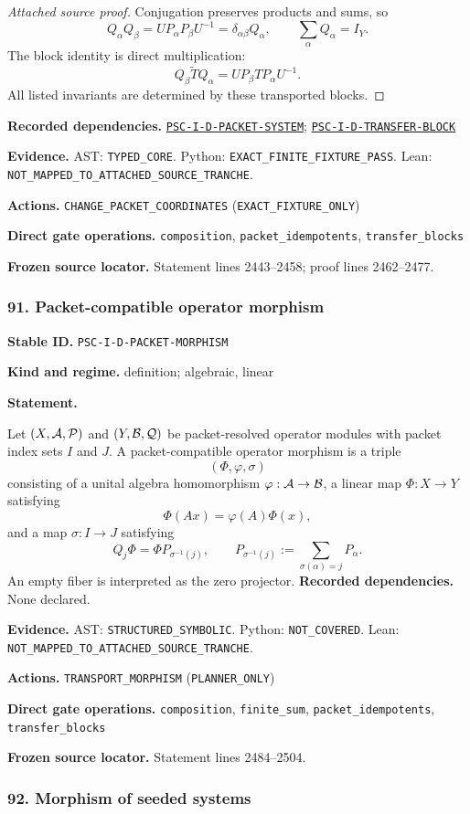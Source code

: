 \documentclass[a4paper,11pt]{article}
\newcommand{\field}[2]{\noindent\textbf{#1.} #2\par}
\begin{document}
\begin{proof}[Attached source proof]
Conjugation preserves products and sums, so
\[
Q_\alpha Q_\beta
=UP_\alpha P_\beta U^{-1}
=\delta_{\alpha\beta}Q_\alpha,
\qquad
\sum_\alpha Q_\alpha=I_Y.
\]
The block identity is direct multiplication:
\[
Q_\beta\widetilde TQ_\alpha
=UP_\beta TP_\alpha U^{-1}.
\]
All listed invariants are determined by these transported blocks.
\end{proof}
\field{Recorded dependencies}{\hyperref[rec:PSC-I-D-PACKET-SYSTEM]{\nolinkurl{PSC-I-D-PACKET-SYSTEM}}; \hyperref[rec:PSC-I-D-TRANSFER-BLOCK]{\nolinkurl{PSC-I-D-TRANSFER-BLOCK}}}
\field{Evidence}{AST: \nolinkurl{TYPED_CORE}. Python: \nolinkurl{EXACT_FINITE_FIXTURE_PASS}. Lean: \nolinkurl{NOT_MAPPED_TO_ATTACHED_SOURCE_TRANCHE}.}
\field{Actions}{\nolinkurl{CHANGE_PACKET_COORDINATES} (\nolinkurl{EXACT_FIXTURE_ONLY})}
\field{Direct gate operations}{\nolinkurl{composition}, \nolinkurl{packet_idempotents}, \nolinkurl{transfer_blocks}}
\field{Frozen source locator}{Statement lines 2443--2458; proof lines 2462--2477.}
\subsubsection*{91. Packet-compatible operator morphism}
\label{rec:PSC-I-D-PACKET-MORPHISM}
\field{Stable ID}{\nolinkurl{PSC-I-D-PACKET-MORPHISM}}
\field{Kind and regime}{definition; algebraic, linear}
\textbf{Statement.}\par
Let $(X,\mathcal A,\mathcal P)$ and $(Y,\mathcal B,\mathcal Q)$ be packet-resolved operator modules with packet index sets $I$ and $J$.  A packet-compatible operator morphism is a triple
\[
(\Phi,\varphi,\sigma)
\]
consisting of a unital algebra homomorphism $\varphi:\mathcal A\to\mathcal B$, a linear map $\Phi:X\to Y$ satisfying
\[
\Phi(Ax)=\varphi(A)\Phi(x),
\]
and a map $\sigma:I\to J$ satisfying
\[
Q_j\Phi
=
\Phi P_{\sigma^{-1}(j)},
\qquad
P_{\sigma^{-1}(j)}:=
\sum_{\sigma(\alpha)=j}P_\alpha.
\]
An empty fiber is interpreted as the zero projector.
\field{Recorded dependencies}{None declared.}
\field{Evidence}{AST: \nolinkurl{STRUCTURED_SYMBOLIC}. Python: \nolinkurl{NOT_COVERED}. Lean: \nolinkurl{NOT_MAPPED_TO_ATTACHED_SOURCE_TRANCHE}.}
\field{Actions}{\nolinkurl{TRANSPORT_MORPHISM} (\nolinkurl{PLANNER_ONLY})}
\field{Direct gate operations}{\nolinkurl{composition}, \nolinkurl{finite_sum}, \nolinkurl{packet_idempotents}, \nolinkurl{transfer_blocks}}
\field{Frozen source locator}{Statement lines 2484--2504.}
\subsubsection*{92. Morphism of seeded systems}
\end{document}
